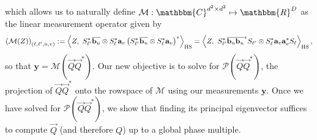 \documentclass[]{spie}  %
\def \vec{\overrightarrow}
\def \a {\mathbf a}
\def \b {\mathbf b}
\def \bar {\overline}
\def \y {\mathbf y}
\def \M {\mathcal{M}}
\def \HS {\rm HS}
\def \P { \mathcal{P}}
\begin{document}
which allows us to naturally define $\mathcal{M}: \mathbbm{C}^{d^2 \times d^2} \mapsto \mathbbm{R}^D$ as the linear measurement operator given by 
\begin{equation}
\left(\mathcal{M}(Z) \right)_{(\ell,\ell',u,v)} := \left\langle  Z, ~S_{\ell'}^* \bar{\b_u} \otimes S_{\ell}^* \a_v \left(S_{\ell'}^* \bar{\b_u} \otimes S_{\ell}^* \a_v\right)^*\right\rangle_{\HS} = \left\langle Z, ~S_{\ell'}^* \bar{\b_u}\bar{\b_u}^* S_{\ell'} \otimes S_\ell^* \a_v \a_v^* S_\ell \right\rangle_{\HS},
\label{Def:Measure_Operator}
\end{equation}
so that $\y = \mathcal{M}(\vec{Q} \vec{Q}^*)$.  Our new objective is to solve for $\P(\vec{Q} \vec{Q}^*)$, the projection of $\vec{Q} \vec{Q}^*$ onto the rowspace of $\M$ using our measurements $\y$.  Once we have solved for $\P(\vec{Q} \vec{Q}^*)$, we show that finding its principal eigenvector suffices to compute $\vec{Q}$ (and therefore $Q$) up to a global phase multiple.
\end{document}
